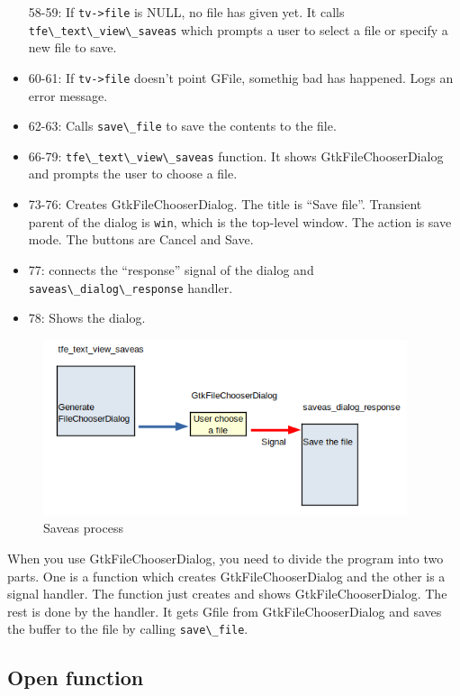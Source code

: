 \begin{itemize}
  58-59: If \passthrough{\lstinline!tv->file!} is NULL, no file has
  given yet. It calls \passthrough{\lstinline!tfe\_text\_view\_saveas!}
  which prompts a user to select a file or specify a new file to save.
\item
  60-61: If \passthrough{\lstinline!tv->file!} doesn't point GFile,
  somethig bad has happened. Logs an error message.
\item
  62-63: Calls \passthrough{\lstinline!save\_file!} to save the contents
  to the file.
\item
  66-79: \passthrough{\lstinline!tfe\_text\_view\_saveas!} function. It
  shows GtkFileChooserDialog and prompts the user to choose a file.
\item
  73-76: Creates GtkFileChooserDialog. The title is ``Save file''.
  Transient parent of the dialog is \passthrough{\lstinline!win!}, which
  is the top-level window. The action is save mode. The buttons are
  Cancel and Save.
\item
  77: connects the ``response'' signal of the dialog and
  \passthrough{\lstinline!saveas\_dialog\_response!} handler.
\item
  78: Shows the dialog.
\end{itemize}

\begin{figure}
\centering
\includegraphics[width=10.7cm,height=5.16cm]{../image/saveas.png}
\caption{Saveas process}
\end{figure}

When you use GtkFileChooserDialog, you need to divide the program into
two parts. One is a function which creates GtkFileChooserDialog and the
other is a signal handler. The function just creates and shows
GtkFileChooserDialog. The rest is done by the handler. It gets Gfile
from GtkFileChooserDialog and saves the buffer to the file by calling
\passthrough{\lstinline!save\_file!}.

\hypertarget{open-function}{%
\subsection{Open function}\label{open-function}}

